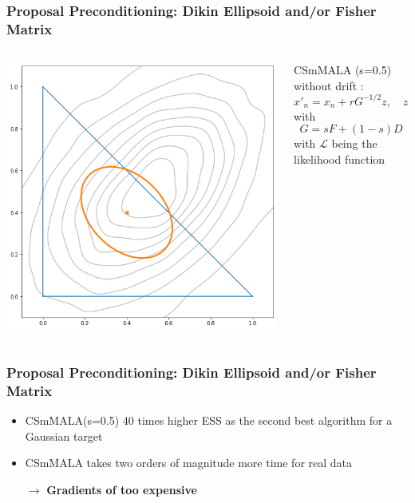 \begin{frame}[t]
    \frametitle{Proposal Preconditioning: Dikin Ellipsoid and/or Fisher Matrix}
    \begin{columns}
    \begin{column}{0.45\textwidth}
        \begin{center}
        \includegraphics[width=\textwidth]{imgs/fisher-dikin-ellipsoid.png}
        \end{center}
    \end{column}
    \begin{column}{0.45\textwidth}
        CSmMALA (s=0.5) without drift \cite{Theorell2019}:
        \[
            x'_{n} = x_n + rG^{-1/2}z, \quad z \sim \mathcal{N}(0,I)
        \]
        with
        \[
            G = sF + (1-s)D    
        \]
        with $\mathcal{L}$ being the likelihood function
    \end{column}
    \end{columns}
\end{frame}

\begin{frame}[c]
    \frametitle{Proposal Preconditioning: Dikin Ellipsoid and/or Fisher Matrix}
    \begin{itemize}
        \item CSmMALA(s=0.5) 40 times higher ESS as the second best algorithm for a Gaussian target \cite{Theorell2019}
        \item CSmMALA takes two orders of magnitude more time for real \Ciso data
        \item[$\to$] \textbf{Gradients of \Ciso too expensive}
    \end{itemize}
\end{frame}

